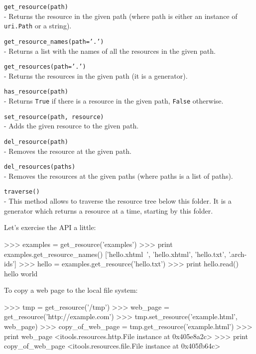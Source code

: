 \begin{api}
  {\tt get\_resource(path)}\\
  - Returns the resource in the given path (where path is either an instance
    of {\tt uri.Path} or a string).

  {\tt get\_resource\_names(path='.')}\\
  - Returns a list with the names of all the resources in the given path.

  {\tt get\_resources(path='.')}\\
  - Returns the resources in the given path (it is a generator).

  {\tt has\_resource(path)}\\
  - Returns {\tt True} if there is a resource in the given path, {\tt False}
    otherwise.

  {\tt set\_resource(path, resource)}\\
  - Adds the given resource to the given path.

  {\tt del\_resource(path)}\\
  - Removes the resource at the given path.

  {\tt del\_resources(paths)}\\
  - Removes the resources at the given paths (where paths is a list of paths).

  {\tt traverse()}\\
  - This method allows to traverse the resource tree below this folder. It
    is a generator which returns a resource at a time, starting by this
    folder.
\end{api}

Let's exercise the API a little:

\begin{code}
    >>> examples = get_resource('examples')
    >>> print examples.get_resource_names()
    ['hello.xhtml~', 'hello.xhtml', 'hello.txt', '.arch-ids']
    >>> hello = examples.get_resource('hello.txt')
    >>> print hello.read()
    hello world
\end{code}

To copy a web page to the local file system:

\begin{code}
    >>> tmp = get_resource('/tmp')
    >>> web_page = get_resource('http://example.com')
    >>> tmp.set_resource('example.html', web_page)
    >>> copy_of_web_page = tmp.get_resource('example.html')
    >>> print web_page
    <itools.resources.http.File instance at 0x405e8a2c>
    >>> print copy_of_web_page
    <itools.resources.file.File instance at 0x405fb64c>
\end{code}

